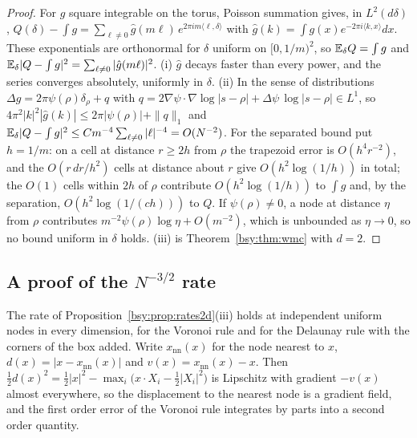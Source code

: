 \begin{proof}
For $g$ square integrable on the torus, Poisson summation gives, in $L^2(d\delta)$, $Q(\delta)-\int g=\sum_{\ell\ne0}\hat g(m\ell)\,e^{2\pi im\langle\ell,\delta\rangle}$ with $\hat g(k)=\int g(x)e^{-2\pi i\langle k,x\rangle}dx$. These exponentials are orthonormal for $\delta$ uniform on $[0,1/m)^2$, so $\mathbb{E}_\delta Q=\int g$ and $\mathbb{E}_\delta|Q-\int g|^2=\sum_{\ell\ne0}|\hat g(m\ell)|^2$. (i) $\hat g$ decays faster than every power, and the series converges absolutely, uniformly in $\delta$. (ii) In the sense of distributions $\Delta g=2\pi\psi(\rho)\delta_\rho+q$ with $q=2\nabla\psi\cdot\nabla\log|s-\rho|+\Delta\psi\,\log|s-\rho|\in L^1$, so $4\pi^2|k|^2|\hat g(k)|\le2\pi|\psi(\rho)|+\|q\|_1$ and $\mathbb{E}_\delta|Q-\int g|^2\le Cm^{-4}\sum_{\ell\ne0}|\ell|^{-4}=O(N^{-2})$. For the separated bound put $h=1/m$: on a cell at distance $r\ge2h$ from $\rho$ the trapezoid error is $O(h^4r^{-2})$, and the $O(r\,dr/h^2)$ cells at distance about $r$ give $O(h^2\log(1/h))$ in total; the $O(1)$ cells within $2h$ of $\rho$ contribute $O(h^2\log(1/h))$ to $\int g$ and, by the separation, $O(h^2\log(1/(ch)))$ to $Q$. If $\psi(\rho)\ne0$, a node at distance $\eta$ from $\rho$ contributes $m^{-2}\psi(\rho)\log\eta+O(m^{-2})$, which is unbounded as $\eta\to0$, so no bound uniform in $\delta$ holds. (iii) is Theorem~\ref{bsy:thm:wmc} with $d=2$.
\end{proof}

\subsection{A proof of the $N^{-3/2}$ rate}\label{bsy:sec:wmc}

The rate of Proposition~\ref{bsy:prop:rates2d}(iii) holds at independent uniform nodes in every dimension, for the Voronoi rule and for the Delaunay rule with the corners of the box added. Write $x_{\mathrm{nn}}(x)$ for the node nearest to $x$, $d(x)=|x-x_{\mathrm{nn}}(x)|$ and $v(x)=x_{\mathrm{nn}}(x)-x$. Then $\frac12d(x)^2=\frac12|x|^2-\max_i\bigl(x\cdot X_i-\frac12|X_i|^2\bigr)$ is Lipschitz with gradient $-v(x)$ almost everywhere, so the displacement to the nearest node is a gradient field, and the first order error of the Voronoi rule integrates by parts into a second order quantity.

